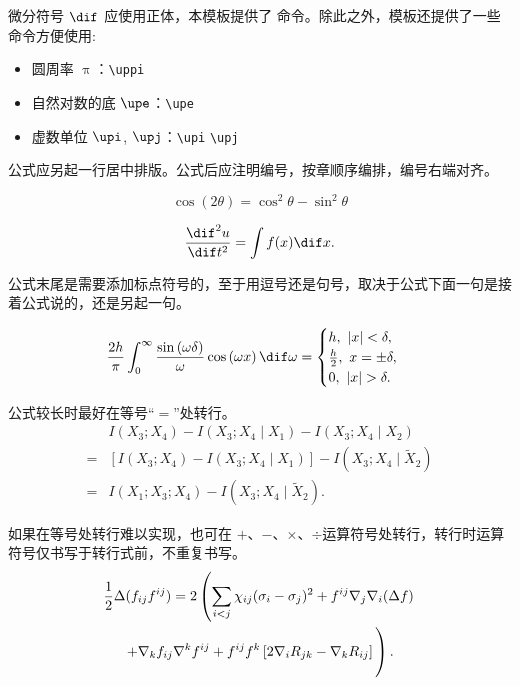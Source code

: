 微分符号 $\dif$ 应使用正体，本模板提供了  命令。除此之外，模板还提供了一些命令方便使用:
\begin{itemize}
  \item 圆周率 $\uppi$：\verb|\uppi|
  \item 自然对数的底 $\upe$：\verb|\upe|
  \item 虚数单位 $\upi$, $\upj$：\verb|\upi| \verb|\upj|
\end{itemize}

公式应另起一行居中排版。公式后应注明编号，按章顺序编排，编号右端对齐。

\begin{equation}
	\cos (2\theta) = \cos^2 \theta - \sin^2 \theta
\end{equation}

\begin{equation}
  \frac{\dif^2 u}{\dif t^2} = \int f(x) \dif x.
\end{equation}

公式末尾是需要添加标点符号的，至于用逗号还是句号，取决于公式下面一句是接着公式说的，还是另起一句。

\begin{equation}
	\frac{2h}{\pi}\int_{0}^{\infty}\frac{\sin\left( \omega\delta \right)}{\omega}
	\cos\left( \omega x \right) \dif\omega = 
	\begin{cases}
		h, \ \left| x \right| < \delta, \\
		\frac{h}{2}, \ x = \pm \delta, \\
		0, \ \left| x \right| > \delta.
	\end{cases}
\end{equation}

公式较长时最好在等号“$=$”处转行。
\begin{align}
    & I (X_3; X_4) - I (X_3; X_4 \mid X_1) - I (X_3; X_4 \mid X_2) \nonumber \\
  = & [I (X_3; X_4) - I (X_3; X_4 \mid X_1)] - I (X_3; X_4 \mid \tilde{X}_2) \\
  = & I (X_1; X_3; X_4) - I (X_3; X_4 \mid \tilde{X}_2).
\end{align}

如果在等号处转行难以实现，也可在 $+$、$-$、$\times$、$\div$运算符号处转行，转行时运算符号仅书写于转行式前，不重复书写。
\begin{multline}
  \frac{1}{2} \Delta (f_{ij} f^{ij}) =
    2 \left(\sum_{i<j} \chi_{ij}(\sigma_{i} - \sigma_{j})^{2}
    + f^{ij} \nabla_{j} \nabla_{i} (\Delta f) \right. \\
  \left. + \nabla_{k} f_{ij} \nabla^{k} f^{ij} +
    f^{ij} f^{k} \left[2\nabla_{i}R_{jk}
    - \nabla_{k} R_{ij} \right] \vphantom{\sum_{i<j}} \right).
\end{multline}


